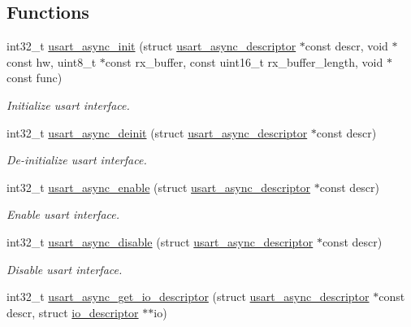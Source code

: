 \subsection*{Functions}
\begin{DoxyCompactItemize}
\item 
int32\+\_\+t \hyperlink{group__doc__driver__hal__usart__async_gaafe146c618b950c9715efb0fdc6a7484}{usart\+\_\+async\+\_\+init} (struct \hyperlink{structusart__async__descriptor}{usart\+\_\+async\+\_\+descriptor} $\ast$const descr, void $\ast$const hw, uint8\+\_\+t $\ast$const rx\+\_\+buffer, const uint16\+\_\+t rx\+\_\+buffer\+\_\+length, void $\ast$const func)
\begin{DoxyCompactList}\small\item\em Initialize usart interface. \end{DoxyCompactList}\item 
int32\+\_\+t \hyperlink{group__doc__driver__hal__usart__async_gab7ef65ba7b4afd13cb11dcc72315ca43}{usart\+\_\+async\+\_\+deinit} (struct \hyperlink{structusart__async__descriptor}{usart\+\_\+async\+\_\+descriptor} $\ast$const descr)
\begin{DoxyCompactList}\small\item\em De-\/initialize usart interface. \end{DoxyCompactList}\item 
int32\+\_\+t \hyperlink{group__doc__driver__hal__usart__async_gaa752e7d978b7f3bc35c97f9a7eb5f98a}{usart\+\_\+async\+\_\+enable} (struct \hyperlink{structusart__async__descriptor}{usart\+\_\+async\+\_\+descriptor} $\ast$const descr)
\begin{DoxyCompactList}\small\item\em Enable usart interface. \end{DoxyCompactList}\item 
int32\+\_\+t \hyperlink{group__doc__driver__hal__usart__async_ga575b7b546a7357088530a9cebf60ad9a}{usart\+\_\+async\+\_\+disable} (struct \hyperlink{structusart__async__descriptor}{usart\+\_\+async\+\_\+descriptor} $\ast$const descr)
\begin{DoxyCompactList}\small\item\em Disable usart interface. \end{DoxyCompactList}\item 
int32\+\_\+t \hyperlink{group__doc__driver__hal__usart__async_ga964be25acbad24e7d0cb9e72f5f5582f}{usart\+\_\+async\+\_\+get\+\_\+io\+\_\+descriptor} (struct \hyperlink{structusart__async__descriptor}{usart\+\_\+async\+\_\+descriptor} $\ast$const descr, struct \hyperlink{structio__descriptor}{io\+\_\+descriptor} $\ast$$\ast$io)
$$
\end{DoxyCompactItemize}
